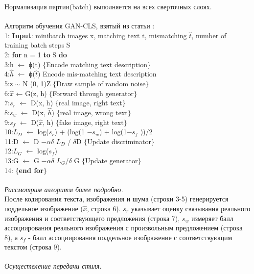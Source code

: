 \documentclass{article}
\begin{document}
    Нормализация партии(batch) выполняется на всех сверточных слоях.
    \\ \\
    Алгоритм обучения GAN-CLS, взятый из статьи :
    \\
    1:   \textbf{Input}: minibatch images x, matching text t, mismatching $\hat{t}$, number of training batch steps S\\
    2:   \textbf{for} n = 1 \textbf{to} S \textbf{do}\\
    3:\indent   h $\leftarrow$ ϕ(t) $\{$Encode matching text description$\}$\\
    4:\indent   $\hat{h}$ $\leftarrow$ ϕ($\hat{t}$) {Encode mis-matching text description}\\
    5:\indent   z $\sim$ N (0, 1)Z $\{$Draw sample of random noise$\}$\\
    6:\indent   $\hat{x}$ ← G(z, h) $\{$Forward through generator$\}$\\
    7:\indent   $s_{r}$ $\leftarrow$ D(x, h) $\{$real image, right text$\}$\\
    8:\indent   $s_{w}$ $\leftarrow$ D(x, $\hat{h}$) $\{$real image, wrong text$\}$\\
    9:\indent   $s_{f}$ $\leftarrow$ D($\hat{x}$, h) $\{$fake image, right text$\}$\\
    10:\indent $L_{D}$ $\leftarrow$ log($s_{r}$) + (log(1 $- s_{w}$) + log(1$ - s_{f}$ ))/2\\
    11:\indent D $\leftarrow$ D $- \alpha \delta$ $L_{D}$ / $\delta$D $\{$Update discriminator$\}$\\
    12:\indent $L_{G}$ $\leftarrow$ log($s_{f}$)\\
    13:\indent G $\leftarrow$ G $- \alpha \delta$ $L_{G}$/$\delta$ G $\{$Update generator$\}$\\
    14:  \textbf {$\{$end for$\}$}\\
    \\
    \textit{Рассмотрим алгоритм более подробно.} \\
    После кодирования текста, изображения и шума (строки 3-5) генерируется поддельное изображение ($\hat{x}$, строка 6). $s_{r}$ указывает оценку связывания реального изображения и соответствующего предложения (строка 7), $s_{w}$ измеряет балл ассоциирования реального изображения с произвольным предложением (строка 8), а $s_{f}$ - балл ассоциирования поддельное изображение с соответствующим текстом (строка 9).
    \\ \\
    \textit{Осуществление передачи стиля.}\\
\end{document}
